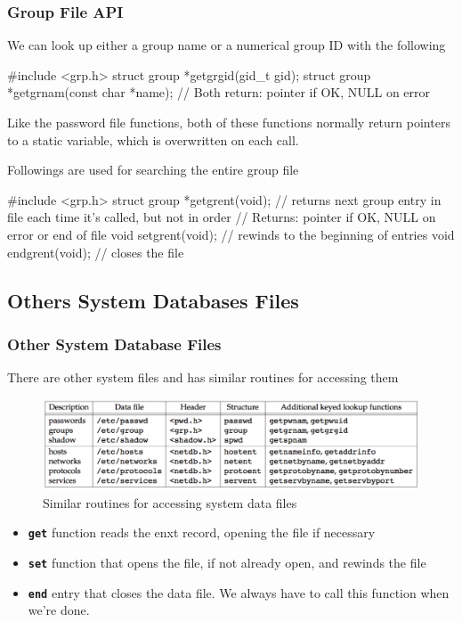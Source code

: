 \documentclass[newPxFont,sthlmFooter,nooffset]{beamer}
\begin{document}
\begin{frame}[containsverbatim,t]
  \frametitle{Group File API}

We can look up either a group name or a numerical group ID with the following

\begin{codedef}
#include <grp.h>
struct group *getgrgid(gid_t gid);
struct group *getgrnam(const char *name);
// Both return: pointer if OK, NULL on error
\end{codedef}

Like the password file functions, both of these functions normally return pointers to a static variable, which is overwritten on each call.

Followings are used for searching the entire group file
\begin{codedef}
#include <grp.h>
struct group *getgrent(void);  // returns next group entry in file each time it's called, but not in order
// Returns: pointer if OK, NULL on error or end of file
void setgrent(void);  // rewinds to the beginning of entries
void endgrent(void);  // closes the file
\end{codedef}


\end{frame}



\subsection{Others System Databases Files}

\begin{frame}[t]
  \frametitle{Other System Database Files}
There are other system files and has similar routines for accessing them


\begin{figure}[h]
  \centering
  \includegraphics[width=\textwidth]{figure/fig6-6_similar.png}
  \caption{Similar routines for accessing system data files}
\end{figure}


\begin{itemize}
\item \textbf{\texttt{get}} function reads the enxt record, opening the file if necessary
\item \textbf{\texttt{set}} function that opens the file, if not already open, and rewinds the file
\item \textbf{\texttt{end}} entry that closes the data file. We always have to call this function when we're done.
\end{itemize}

\end{frame}
\end{document}
